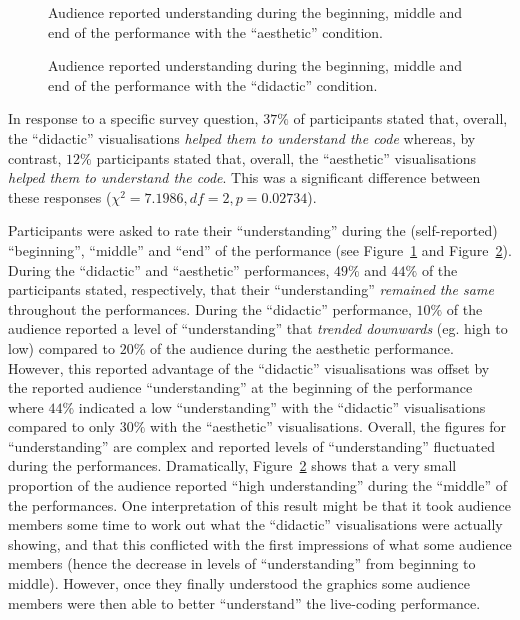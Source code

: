 \documentclass{sig-alternate}
\begin{document}
\begin{figure}
\centering
{}
\caption{Audience reported understanding during the beginning, middle
  and end of the performance with the ``aesthetic'' condition.}
\label{fig:aesthetic-understanding}
\end{figure}

\begin{figure}
\centering
{}
\caption{Audience reported understanding during the beginning, middle
  and end of the performance with the ``didactic'' condition.}
\label{fig:didactic-understanding}
\end{figure}

In response to a specific survey question, $37\%$ of participants
stated that, overall, the ``didactic'' visualisations \textit{helped
  them to understand the code} whereas, by contrast, $12\%$
participants stated that, overall, the ``aesthetic'' visualisations
\textit{helped them to understand the code}. This was a significant
difference between these responses ($\chi^2=7.1986,df=2,p=0.02734$).

Participants were asked to rate their ``understanding'' during the
(self-reported) ``beginning'', ``middle'' and ``end'' of the
performance (see Figure~\ref{fig:aesthetic-understanding} and
Figure~\ref{fig:didactic-understanding}). During the ``didactic'' and
``aesthetic'' performances, $49\%$ and $44\%$ of the participants
stated, respectively, that their ``understanding'' \textit{remained
  the same} throughout the performances. During the ``didactic''
performance, $10\%$ of the audience reported a level of
``understanding'' that \textit{trended downwards} (eg. high to low)
compared to $20\%$ of the audience during the aesthetic performance.
However, this reported advantage of the ``didactic'' visualisations
was offset by the reported audience ``understanding'' at the beginning
of the performance where $44\%$ indicated a low ``understanding'' with
the ``didactic'' visualisations compared to only $30\%$ with the
``aesthetic'' visualisations. Overall, the figures for
``understanding'' are complex and reported levels of ``understanding''
fluctuated during the performances. Dramatically,
Figure~\ref{fig:didactic-understanding} shows that a very small
proportion of the audience reported ``high understanding'' during the
``middle'' of the performances. One interpretation of this result
might be that it took audience members some time to work out what the
``didactic'' visualisations were actually showing, and that this
conflicted with the first impressions of what some audience members
(hence the decrease in levels of ``understanding'' from beginning to
middle). However, once they finally understood the graphics some
audience members were then able to better ``understand'' the
live-coding performance.
\end{document}
